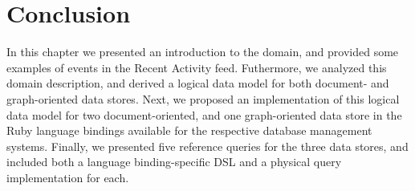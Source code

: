 \section{Conclusion}
\label{sec:data-model-conclusion}

In this chapter we presented an introduction to the domain, and provided some examples of events in the Recent Activity feed.
Futhermore, we analyzed this domain description, and derived a logical data model for both document- and graph-oriented data stores.
Next, we proposed an implementation of this logical data model for two document-oriented, and one graph-oriented data store in the Ruby language bindings available for the respective database management systems.
Finally, we presented five reference queries for the three data stores, and included both a language binding-specific DSL and a physical query implementation for each.

